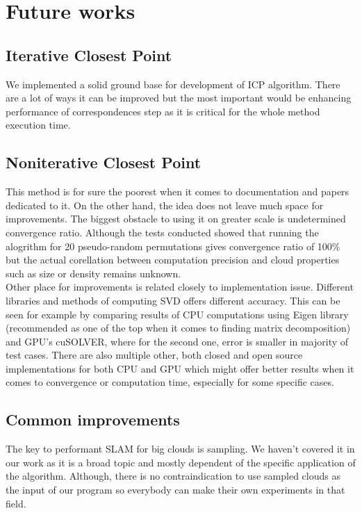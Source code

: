 \documentclass[titlepage]{article}
\begin{document}
\section{Future works}

\subsection{Iterative Closest Point}
We implemented a solid ground base for development of ICP algorithm. There are a lot of ways it can be improved but the most important would be enhancing performance of correspondences step as it is critical for the whole method execution time. 

\subsection{Noniterative Closest Point}
This method is for sure the poorest when it comes to documentation and papers dedicated to it. On the other hand, the idea does not leave much space for improvements. The biggest obstacle to using it on greater scale is undetermined convergence ratio. Although the tests conducted showed that running the alogrithm for 20 pseudo-random permutations gives convergence ratio of 100\% but the actual corellation between computation precision and cloud properties such as size or density remains unknown.\\
Other place for improvements is related closely to implementation issue. Different libraries and methods of computing SVD offers different accuracy. This can be seen for example by comparing results of CPU computations using Eigen library (recommended as one of the top when it comes to finding matrix decomposition) and GPU's cuSOLVER, where for the second one, error is smaller in majority of test cases. There are also multiple other, both closed and open source implementations for both CPU and GPU which might offer better results when it comes to convergence or computation time, especially for some specific cases.

\subsection{Common improvements}
The key to performant SLAM for big clouds is sampling. We haven't covered it in our work as it is a broad topic and mostly dependent of the specific application of the algorithm. Although, there is no contraindication to use sampled clouds as the input of our program so everybody can make their own experiments in that field.

\newpage
\printbibliography
\end{document}
